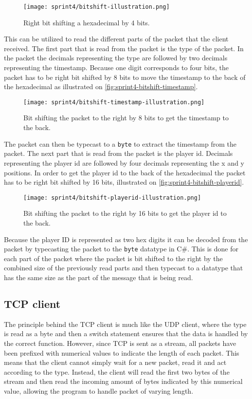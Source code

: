 \begin{figure}[H]
    \centering
    \texttt{[image: sprint4/bitshift-illustration.png]}
    \caption{Right bit shifting a hexadecimal by 4 bits.}
    \label{fig:sprint4-bit-shift-basic}
\end{figure}
\noindent
This can be utilized to read the different parts of the packet that the client received.
The first part that is read from the packet is the type of the packet.
In the packet the decimals representing the type are followed by two decimals representing the timestamp.
Because one digit corresponds to four bits, the packet has to be right bit shifted by 8 bits to move the timestamp to the back of the hexadecimal as illustrated on \autoref{fig:sprint4-bitshift-timestamp}.
\begin{figure}[H]
    \centering
    \texttt{[image: sprint4/bitshift-timestamp-illustration.png]}
    \caption{Bit shifting the packet to the right by 8 bits to get the timestamp to the back.}
    \label{fig:sprint4-bitshift-timestamp}
\end{figure}
\noindent
The packet can then be typecast to a \texttt{byte} to extract the timestamp from the packet.
The next part that is read from the packet is the player id.
Decimals representing the player id are followed by four decimals representing the x and y positions.
In order to get the player id to the back of the hexadecimal the packet has to be right bit shifted by 16 bits, illustrated on \autoref{fig:sprint4-bitshift-playerid}.
\begin{figure}[H]
    \centering
    \texttt{[image: sprint4/bitshift-playerid-illustration.png]}
    \caption{Bit shifting the packet to the right by 16 bits to get the player id to the back.}
    \label{fig:sprint4-bitshift-playerid}
\end{figure}
\noindent
Because the player ID is represented as two hex digits it can be decoded from the packet by typecasting the packet to the \texttt{byte} datatype in C\#.
This is done for each part of the packet where the packet is bit shifted to the right by the combined size of the previously read parts and then typecast to a datatype that has the same size as the part of the message that is being read.
\subsection*{TCP client}
The principle behind the TCP client is much like the UDP client, where the type is read as a byte and then a switch statement ensures that the data is handled by the correct function.
However, since TCP is sent as a stream, all packets have been prefixed with numerical values to indicate the length of each packet.
This means that the client cannot simply wait for a new packet, read it and act according to the type.
Instead, the client will read the first two bytes of the stream and then read the incoming amount of bytes indicated by this numerical value, allowing the program to handle packet of varying length.

